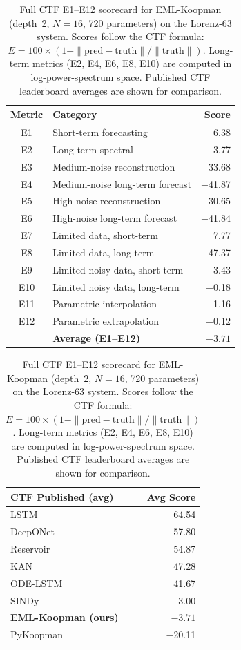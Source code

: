 \documentclass[11pt]{article}
\begin{document}
\begin{table}[t]
\centering
\caption{Full CTF E1--E12 scorecard for EML-Koopman (depth~2, $N\!=\!16$, 720
  parameters) on the Lorenz-63 system.  Scores follow the CTF formula:
  $E = 100 \times (1 - \|\text{pred} - \text{truth}\|/\|\text{truth}\|)$.
  Long-term metrics (E2, E4, E6, E8, E10) are computed in log-power-spectrum
  space.  Published CTF leaderboard averages are shown for comparison.}
\label{tab:full-ctf}
\begin{tabular}{clr}
\toprule
Metric & Category & Score \\
\midrule
E1  & Short-term forecasting            &   6.38 \\
E2  & Long-term spectral                &   3.77 \\
\midrule
E3  & Medium-noise reconstruction       &  33.68 \\
E4  & Medium-noise long-term forecast   & $-$41.87 \\
E5  & High-noise reconstruction         &  30.65 \\
E6  & High-noise long-term forecast     & $-$41.84 \\
\midrule
E7  & Limited data, short-term          &   7.77 \\
E8  & Limited data, long-term           & $-$47.37 \\
E9  & Limited noisy data, short-term    &   3.43 \\
E10 & Limited noisy data, long-term     &  $-$0.18 \\
\midrule
E11 & Parametric interpolation          &   1.16 \\
E12 & Parametric extrapolation          &  $-$0.12 \\
\midrule
    & \textbf{Average (E1--E12)}        & $\mathbf{-3.71}$ \\
\bottomrule
\end{tabular}

\vspace{4pt}
\begin{tabular}{lr}
\toprule
CTF Published (avg) & Avg Score \\
\midrule
LSTM        &  64.54 \\
DeepONet    &  57.80 \\
Reservoir   &  54.87 \\
KAN         &  47.28 \\
ODE-LSTM    &  41.67 \\
SINDy       & $-$3.00 \\
\textbf{EML-Koopman (ours)} & $\mathbf{-3.71}$ \\
PyKoopman   & $-$20.11 \\
\bottomrule
\end{tabular}
\end{table}
\end{document}
